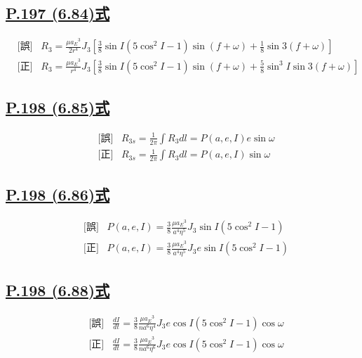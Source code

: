 \documentclass[9pt,fleqn]{bxjsarticle}
\begin{document}
\subsection*{\underline{P.197 (6.84)式}}
\begin{align*}
    &\text{[誤]} \hspace{10pt} R_3 = \frac{\mu{a_E}^3}{2r^4}J_3\left[\frac{3}{8}\sin{I}\left(5\cos^2{I}-1\right)\sin{\left(f+\omega\right)} + \frac{1}{8}\sin{3\left(f+\omega\right)}\right] \\
    &\text{[正]} \hspace{10pt} R_3 = \frac{\mu{a_E}^3}{r^4}J_3\left[\frac{3}{8}\sin{I}\left(5\cos^2{I}-1\right)\sin{\left(f+\omega\right)} + \frac{5}{8}\sin^3{I}\sin{3\left(f+\omega\right)}\right] 
\end{align*}

\subsection*{\underline{P.198 (6.85)式}}
\begin{align*}
    &\text{[誤]} \hspace{10pt} R_{3s} = \frac{1}{2\pi}{\int}R_3dl=P(a,e,I)e\sin{\omega} \\
    &\text{[正]} \hspace{10pt} R_{3s} = \frac{1}{2\pi}{\int}R_3dl=P(a,e,I)\sin{\omega} 
\end{align*}

\subsection*{\underline{P.198 (6.86)式}}
\begin{align*}
    &\text{[誤]} \hspace{10pt} P(a,e,I) = \frac{3}{8}\frac{\mu{a_E}^3}{a^4\eta^5}J_3\sin{I}(5\cos^2I-1) \\
    &\text{[正]} \hspace{10pt} P(a,e,I) = \frac{3}{8}\frac{\mu{a_E}^3}{a^4\eta^5}J_3e\sin{I}(5\cos^2I-1)
\end{align*}

\subsection*{\underline{P.198 (6.88)式}}
\begin{align*}
    &\text{[誤]} \hspace{10pt} \frac{dI}{dt} = \frac{3}{8}\frac{\mu{a_E}^3}{na^6\eta^4}J_3e\cos{I}\left(5\cos^2{I}-1\right)\cos{\omega} \\
    &\text{[正]} \hspace{10pt} \frac{dI}{dt} = \frac{3}{8}\frac{\mu{a_E}^3}{na^6\eta^6}J_3e\cos{I}\left(5\cos^2{I}-1\right)\cos{\omega}
\end{align*}
\end{document}
